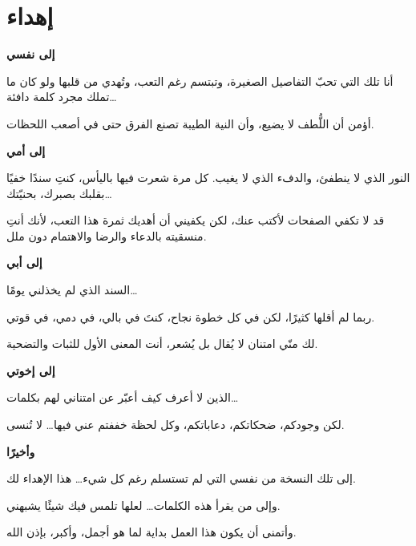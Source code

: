 \documentclass[12pt, a4paper, twoside]{report}
\begin{document}
\listoftables
{}
\newpage

\chapter*{إهداء}

\begin{center}
\vspace*{2cm}

{\Large \textbf{إلى نفسي}}

\vspace{1cm}

أنا تلك التي تحبّ التفاصيل الصغيرة، وتبتسم رغم التعب، وتُهدي من قلبها ولو كان ما تملك مجرد كلمة دافئة…

أؤمن أن اللُّطف لا يضيع، وأن النية الطيبة تصنع الفرق حتى في أصعب اللحظات.

\vspace{1cm}

{\Large \textbf{إلى أمي}}

\vspace{1cm}

النور الذي لا ينطفئ، والدفء الذي لا يغيب. كل مرة شعرت فيها باليأس، كنتِ سندًا خفيًا بقلبك بصبرك، بحنيّتك…

قد لا تكفي الصفحات لأكتب عنك، لكن يكفيني أن أهديك ثمرة هذا التعب، لأنك أنتِ منسقيته بالدعاء والرضا والاهتمام دون ملل.

\vspace{1cm}

{\Large \textbf{إلى أبي}}

\vspace{1cm}

السند الذي لم يخذلني يومًا…

ربما لم أقلها كثيرًا، لكن في كل خطوة نجاح، كنتَ في بالي، في دمي، في قوتي.

لك منّي امتنان لا يُقال بل يُشعر، أنت المعنى الأول للثبات والتضحية.

\vspace{1cm}

{\Large \textbf{إلى إخوتي}}

\vspace{1cm}

الذين لا أعرف كيف أعبّر عن امتناني لهم بكلمات…

لكن وجودكم، ضحكاتكم، دعاباتكم، وكل لحظة خففتم عني فيها… لا تُنسى.

\vspace{1cm}

{\Large \textbf{وأخيرًا}}

\vspace{1cm}

إلى تلك النسخة من نفسي التي لم تستسلم رغم كل شيء… هذا الإهداء لك.

وإلى من يقرأ هذه الكلمات… لعلها تلمس فيك شيئًا يشبهني.

وأتمنى أن يكون هذا العمل بداية لما هو أجمل، وأكبر، بإذن الله.

\end{center}
\newpage
\end{document}
